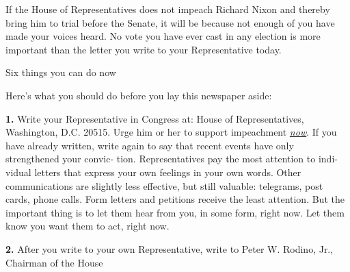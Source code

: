 \documentclass{article}
\begin{document}
\begin{multicols}{3}
If the House of Representatives does not impeach\linebreak
Richard Nixon and thereby bring him to trial before\linebreak
the Senate, it will be because not enough of you\linebreak
have made your voices heard. No vote you have\linebreak
ever cast in any election is more important than the\linebreak
letter you write to your Representative today.

\columnbreak
\begin{center}
\setmainfont{Arial Bold}
Six things you can do now
\end{center}

Here's what you should do before you lay this\lb
newspaper aside:

{\bf 1.} Write your Representative in Congress at:\lb
House of Representatives, Washington, D.C. 20515.\lb
Urge him or her to support impeachment \underline{\textit{now}}. %
If\lb
you have already written, write again to say that\lb
recent events have only strengthened your convic-\lb
tion. Representatives pay the most attention to indi-\lb
vidual letters that express your own feelings in your\lb
own words. Other communications are slightly less\lb
effective, but still valuable: telegrams, post cards,\lb
phone calls. Form letters and petitions receive the\lb
least attention. But the important thing is to let them\lb
hear from you, in some form, right now. Let them\lb
know you want them to act, right now.

{\bf 2.} After you write to your own Representative,\lb
write to Peter W. Rodino, Jr., Chairman of the House\lb

\begin{center}
\end{center}


\end{multicols}
\end{document}
